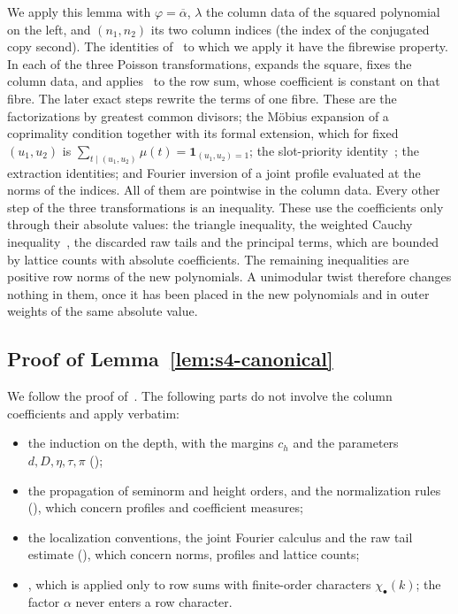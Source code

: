 \documentclass[11pt]{article}
\numberwithin{equation}{section}
\newcommand{\ind}{\mathbf1}
\begin{document}
We apply this lemma with $\varphi=\overline\alpha$, $\lambda$ the column data of the squared polynomial on the left,
and $(n_1,n_2)$ its two column indices (the index of the conjugated copy second). The identities
of~\cite{OAI78} to which we apply it have the fibrewise property. In each of the three Poisson transformations,
\cite{OAI78} expands the square, fixes the column data, and applies~\cite[Lemma~17.5]{OAI78} to the row sum, whose coefficient is constant on that fibre. The later exact steps rewrite
the terms of one fibre. These are the factorizations by greatest common divisors; the M\"obius expansion of a
coprimality condition together with its formal extension, which for fixed $(u_1,u_2)$ is
$\sum_{t\mid(u_1,u_2)}\mu(t)=\ind_{(u_1,u_2)=1}$; the slot-priority identity~\cite[eq.~(17.16)]{OAI78};
the extraction identities; and Fourier inversion of a joint profile evaluated at the norms of the indices. All
of them are pointwise in the column data. Every other step of the three transformations is an inequality. These
use the coefficients only through their absolute values: the triangle inequality, the weighted Cauchy
inequality~\cite[eq.~(D)]{OAI78}, the discarded raw tails and the principal terms, which are
bounded by lattice counts with absolute coefficients. The remaining inequalities are positive row norms of the new
polynomials. A unimodular twist therefore changes nothing in them, once it has been placed in the new polynomials
and in outer weights of the same absolute value.

\subsection{Proof of Lemma~\ref{lem:s4-canonical}}\label{sec:s4-canonical-proof}
We follow the proof of~\cite[Lemma~17.2]{OAI78}. The following parts do not involve
the column coefficients and apply verbatim:
\begin{itemize}
\item the induction on the depth, with the margins $c_h$ and the parameters $d,D,\eta,\tau,\pi$ (\cite[proof of Lemma~17.2]{OAI78});
\item the propagation of seminorm and height orders, \cite[Lemma~17.3,
 Cor.~17.4]{OAI78} and the normalization rules (\cite[Section~17.3]{OAI78}), which concern profiles
 and coefficient measures;
\item the localization conventions, the joint Fourier calculus and the raw tail estimate
 (\cite[proof of Lemma~17.2, \emph{The two-transform reduction}]{OAI78}), which concern norms, profiles and lattice counts;
\item \cite[Lemma~17.5]{OAI78}, which is applied only to row sums with finite-order characters
 $\chi_\bullet(k)$; the factor $\alpha$ never enters a row character.
\end{itemize}
\end{document}
